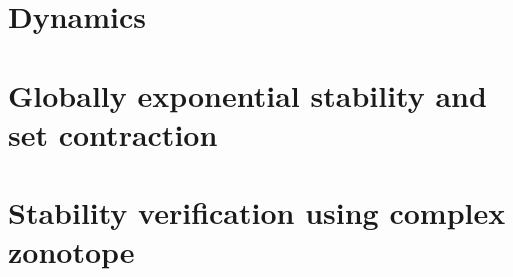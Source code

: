 \section{Dynamics}


\section{Globally exponential stability and set contraction}


\section{Stability verification using complex zonotope}

